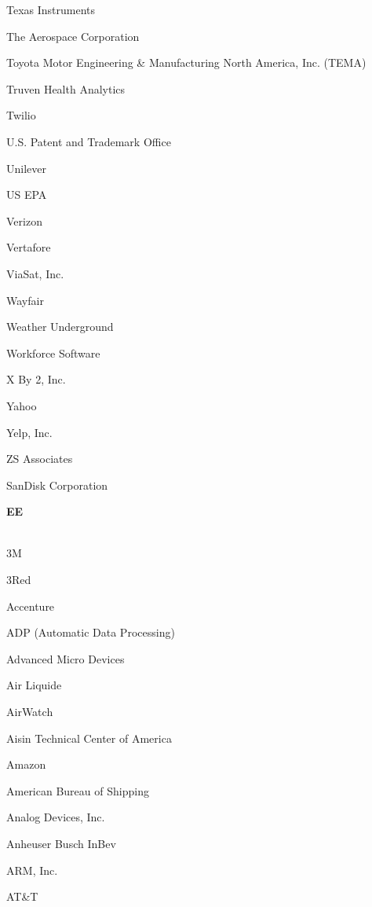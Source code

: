 \documentclass[twoside]{article}
\begin{document}
\begin{center}
\begin{multicols}{5}
\begin{FlushLeft}
\begin{compactitem}
\item Texas Instruments
\item The Aerospace Corporation
\item Toyota Motor Engineering \& Manufacturing North America, Inc. (TEMA)
\item Truven Health Analytics
\item Twilio
\item U.S. Patent and Trademark Office
\item Unilever
\item US EPA
\item Verizon
\item Vertafore
\item ViaSat, Inc.
\item Wayfair
\item Weather Underground
\item Workforce Software
\item X By 2, Inc.
\item Yahoo
\item Yelp, Inc.
\item ZS Associates
\item SanDisk Corporation
\end{compactitem}
        \end{FlushLeft}
        \vspace{1em}
        {\fontsize{14}{16}\selectfont \bf EE}\\
        \vspace{-1em}
        ~\hrulefill~
        \vspace{-.9em}
        \begin{FlushLeft}
        \begin{compactitem}
        \item 3M
\item 3Red
\item Accenture
\item ADP (Automatic Data Processing)
\item Advanced Micro Devices
\item Air Liquide
\item AirWatch
\item Aisin Technical Center of America
\item Amazon
\item American Bureau of Shipping
\item Analog Devices, Inc.
\item Anheuser Busch InBev
\item ARM, Inc.
\item AT\&T

\end{compactitem}
\end{FlushLeft}
\end{multicols}
\end{center}
\end{document}
